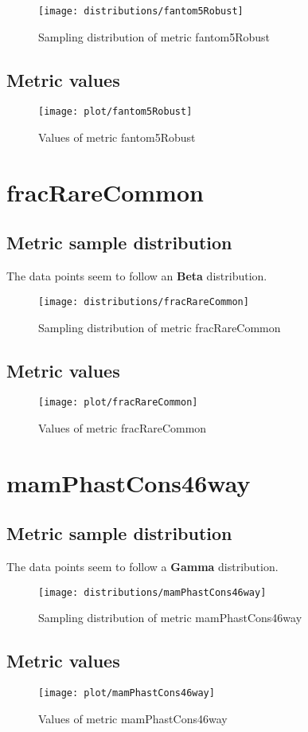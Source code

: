 \documentclass[\main/main.tex]{subfiles}
\begin{document}
\begin{figure}
  \texttt{[image: distributions/fantom5Robust]}
  \caption{Sampling distribution of metric fantom5Robust}
\end{figure}
\subsection{Metric values}
\begin{figure}
  \texttt{[image: plot/fantom5Robust]}
  \caption{Values of metric fantom5Robust}
\end{figure}

\clearpage
\section{fracRareCommon}
\subsection{Metric sample distribution}
The data points seem to follow an \textbf{Beta} distribution.

\begin{figure}
  \texttt{[image: distributions/fracRareCommon]}
  \caption{Sampling distribution of metric fracRareCommon}
\end{figure}
\subsection{Metric values}
\begin{figure}
  \texttt{[image: plot/fracRareCommon]}
  \caption{Values of metric fracRareCommon}
\end{figure}

\clearpage
\section{mamPhastCons46way}
\subsection{Metric sample distribution}
The data points seem to follow a \textbf{Gamma} distribution.

\begin{figure}
  \texttt{[image: distributions/mamPhastCons46way]}
  \caption{Sampling distribution of metric mamPhastCons46way}
\end{figure}
\subsection{Metric values}
\begin{figure}
  \texttt{[image: plot/mamPhastCons46way]}
  \caption{Values of metric mamPhastCons46way}
\end{figure}
\end{document}
